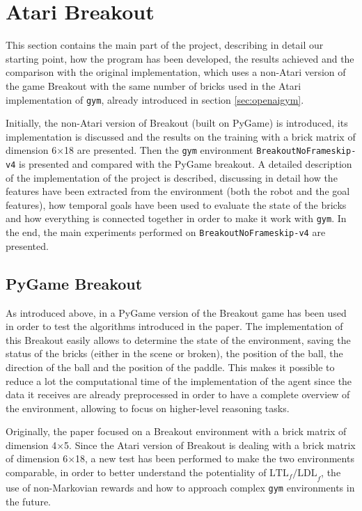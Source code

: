 \section{Atari Breakout}
This section contains the main part of the project, describing in detail our
starting point, how the program has been developed, the results achieved and the
comparison with the original implementation, which uses a non-Atari version
of the game Breakout \cite{DBLP:journals/corr/abs-1807-06333} with the same
number of bricks used in the Atari implementation of \texttt{gym},
already introduced in section \ref{sec:openaigym}.

Initially, the non-Atari version of Breakout (built on PyGame) is introduced,
its implementation is discussed and the results on the training with a brick
matrix of dimension 6$\times$18 are presented. Then the \texttt{gym}
environment \texttt{BreakoutNoFrameskip-v4} is presented and compared with the
PyGame breakout. A detailed description of the implementation of the project
is described, discussing in detail how the features have been extracted from
the environment (both the robot and the goal features), how temporal goals
have been used to evaluate the state of the bricks and how everything is
connected together in order to make it work with \texttt{gym}. In the end,
the main experiments performed on \texttt{BreakoutNoFrameskip-v4} are
presented.

\subsection{PyGame Breakout}
As introduced above, in \cite{DBLP:journals/corr/abs-1807-06333} a PyGame
version of the Breakout game has been used in order to test the algorithms
introduced in the paper. The implementation of this Breakout easily allows
to determine the state of the environment, saving the status of the bricks
(either in the scene or broken), the position of the ball, the direction of
the ball and the position of the paddle. This makes it possible to reduce
a lot the computational time of the implementation of the agent since the
data it receives are already preprocessed in order to have a complete
overview of the environment, allowing to focus on higher-level reasoning
tasks.

Originally, the paper focused on a Breakout environment with a brick matrix
of dimension 4$\times$5. Since the Atari version of Breakout is dealing with
a brick matrix of dimension 6$\times$18, a new test has been performed to
make the two environments comparable, in order to better understand the
potentiality of $\text{LTL}_f\text{/LDL}_f$, the use of non-Markovian rewards
and how to approach complex \texttt{gym} environments in the future.

